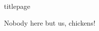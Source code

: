 \documentclass[a4paper,notitlepage,10pt]{article}
\begin{document}

{titlepage}


Nobody here but us, chickens!
 
\end{document}

